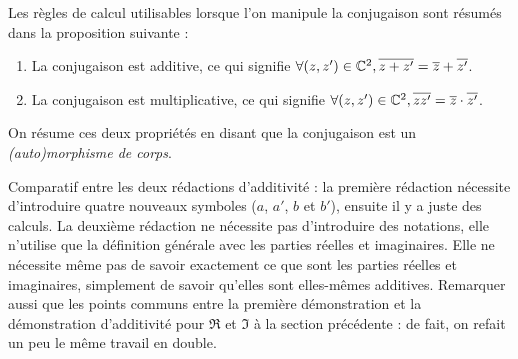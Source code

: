 Les règles de calcul utilisables lorsque l'on manipule la conjugaison sont résumés dans la proposition suivante : 

\begin{proposition}
\begin{enumerate}
\item La conjugaison est additive, ce qui signifie $\forall (z, z')\in \mathbb{C}^2, \overline{z+z'} = \overline{z}+\overline{z'}$. 
\item La conjugaison est multiplicative, ce qui signifie $\forall (z,z')\in\mathbb{C}^2, \overline{zz'} = \overline{z}\cdot\overline{z'}$.
\end{enumerate}
On résume ces deux propriétés en disant que \og la conjugaison est un \emph{(auto)morphisme de corps}.\fg{}
% 
\end{proposition}

\begin{remarque}
Comparatif entre les deux rédactions d'additivité : la première rédaction nécessite d'introduire quatre nouveaux symboles ($a$, $a'$, $b$ et $b'$), ensuite il y a juste des calculs. La deuxième rédaction ne nécessite pas d'introduire des notations, elle n'utilise que la définition générale avec les parties réelles et imaginaires. Elle ne nécessite même pas de savoir exactement ce que sont les parties réelles et imaginaires, simplement de savoir qu'elles sont elles-mêmes additives. Remarquer aussi que les points communs entre la première démonstration et la démonstration d'additivité pour $\Re$ et $\Im$ à la section précédente : de fait, on refait un peu le même travail en double.
\end{remarque}


